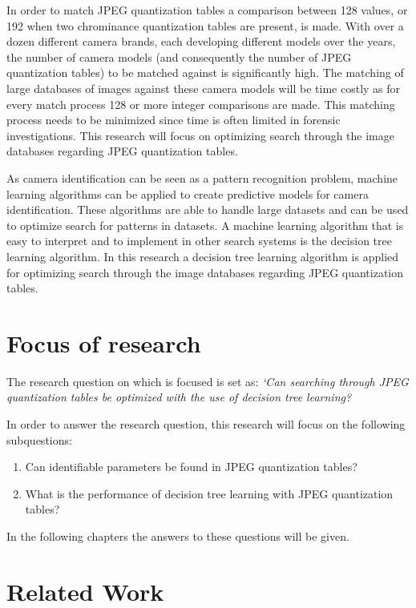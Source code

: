 In order to match JPEG quantization tables a comparison between 128 values, or 192 when two chrominance quantization tables are present, is made. With over a dozen different camera brands, each developing different models over the years, the number of camera models (and consequently the number of JPEG quantization tables) to be matched against is significantly high. The matching of large databases of images against these camera models will be time costly as for every match process 128 or more integer comparisons are made. This matching process needs to be minimized since time is often limited in forensic investigations. This research will focus on optimizing search through the image databases regarding JPEG quantization tables.

As camera identification can be seen as a pattern recognition problem\cite{luo2007survey}, machine learning algorithms can be applied to create predictive models for camera identification. These algorithms are able to handle large datasets and can be used to optimize search for patterns in datasets. A machine learning algorithm that is easy to interpret and to implement in other search systems is the decision tree learning algorithm. In this research a decision tree learning algorithm is applied for optimizing search through the image databases regarding JPEG quantization tables.


\section{Focus of research}
The research question on which is focused is set as: \textit{`Can searching through JPEG quantization tables be optimized with the use of decision tree learning?}

In order to answer the research question, this research will focus on the following subquestions:
\begin{enumerate}
\item Can identifiable parameters be found in JPEG quantization tables?
\item What is the performance of decision tree learning with JPEG quantization tables?
\end{enumerate}
In the following chapters the answers to these questions will be given.


\section{Related Work}

